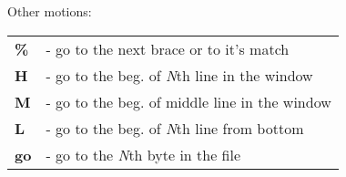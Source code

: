 \documentclass[a4paper,8pt]{extarticle}
\begin{document}
\begin{multicols*}{3}
        \noindent
        {\large Other motions:}\\
        \begin{tabular}{ l l }
            \textbf{\%}                         &    - go to the next brace or to it's match                \\
            \textbf{H}                          &    - go to the beg. of \textsl{N}th line in the window    \\
            \textbf{M}                          &    - go to the beg. of middle line in the window          \\
            \textbf{L}                          &    - go to the beg. of \textsl{N}th line from bottom      \\
            \textbf{go}                         &    - go to the \textsl{N}th byte in the file              \\
        \end{tabular}\\


\end{multicols*}
\end{document}
